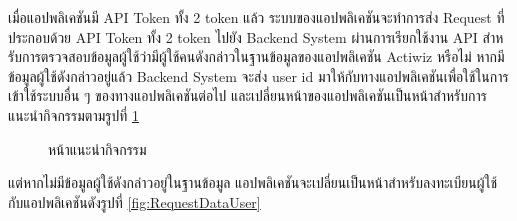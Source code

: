 \documentclass[14pt,oneside,openright,a4paper]{cpe-thai-project}
\begin{document}
 เมื่อแอปพลิเคชันมี API Token ทั้ง 2 token แล้ว ระบบของแอปพลิเคชันจะทำการส่ง Request ที่ประกอบด้วย API Token ทั้ง 2 token ไปยัง Backend System 
 ผ่านการเรียกใช้งาน API สําหรับการตรวจสอบข้อมูลผู้ใช้ว่ามีผู้ใช้คนดังกล่าวในฐานข้อมูลของแอปพลิเคชัน Actiwiz หรือไม่ หากมีข้อมูลผู้ใช้ดังกล่าวอยู่แล้ว Backend System จะส่ง user id มาให้กับทางแอปพลิเคชันเพื่อใช้ในการเข้าใช้ระบบอื่น ๆ ของทางแอปพลิเคชันต่อไป และเปลี่ยนหน้าของแอปพลิเคชันเป็นหน้าสำหรับการแนะนำกิจกรรมตามรูปที่  \ref{fig:3}
 
 \begin{figure}[H]\centering
  \setlength{\fboxrule}{0.5mm}
  \setlength{\fboxsep}{0.5cm}
  \caption{หน้าแนะนำกิจกรรม}\label{fig:3}
 \end{figure}
 
 แต่หากไม่มีข้อมูลผู้ใช้ดังกล่าวอยู่ในฐานข้อมูล แอปพลิเคชันจะเปลี่ยนเป็นหน้าสำหรับลงทะเบียนผู้ใช้กับแอปพลิเคชันดังรูปที่ \ref{fig:RequestDataUser}
 
\end{document}
